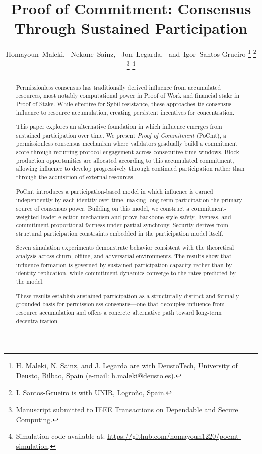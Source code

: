 \documentclass[10pt,journal,twoside]{IEEEtran}
\title{Proof of Commitment: Consensus Through
	Sustained Participation}
\author{Homayoun~Maleki,~\IEEEmembership{}
	Nekane~Sainz,~\IEEEmembership{}
	Jon~Legarda,~\IEEEmembership{}
	and~Igor~Santos-Grueiro%
	\thanks{H. Maleki, N. Sainz, and J. Legarda are with
		DeustoTech, University of Deusto, Bilbao, Spain
		(e-mail: h.maleki@deusto.es).}%
	\thanks{I. Santos-Grueiro is with UNIR,
		Logro\~{n}o, Spain.}%
	\thanks{Manuscript submitted to IEEE Transactions on
		Dependable and Secure Computing.}%
	\thanks{Simulation code available at:
		\url{https://github.com/homayoun1220/pocmt-simulation}.}}
\theoremstyle{remark}
\begin{document}
	\maketitle
	\IEEEpeerreviewmaketitle
	
	\begin{abstract}
		Permissionless consensus has traditionally derived influence
		from accumulated resources, most notably computational power
		in Proof of Work and financial stake in Proof of Stake.
		While effective for Sybil resistance, these approaches tie
		consensus influence to resource accumulation, creating
		persistent incentives for concentration.
		
		This paper explores an alternative foundation in which
		influence emerges from sustained participation over time.
		We present \emph{Proof of Commitment} (PoCmt), a
		permissionless consensus mechanism where validators
		gradually build a commitment score through recurring
		protocol engagement across consecutive time windows.
		Block-production opportunities are allocated according to
		this accumulated commitment, allowing influence to develop
		progressively through continued participation rather than
		through the acquisition of external resources.
		
		PoCmt introduces a participation-based model in which
		influence is earned independently by each identity over
		time, making long-term participation the primary source of
		consensus power. Building on this model, we construct a
		commitment-weighted leader election mechanism and prove
		backbone-style safety, liveness, and commitment-proportional
		fairness under partial synchrony. Security derives from
		structural participation constraints embedded in the
		participation model itself.
		
		Seven simulation experiments demonstrate behavior consistent
		with the theoretical analysis across churn, offline, and
		adversarial environments. The results show that influence
		formation is governed by sustained participation capacity
		rather than by identity replication, while commitment
		dynamics converge to the rates predicted by the model.
		
		These results establish sustained participation as a
		structurally distinct and formally grounded basis for
		permissionless consensus—one that decouples influence from
		resource accumulation and offers a concrete alternative path
		toward long-term decentralization.
	\end{abstract}
	
\end{document}
